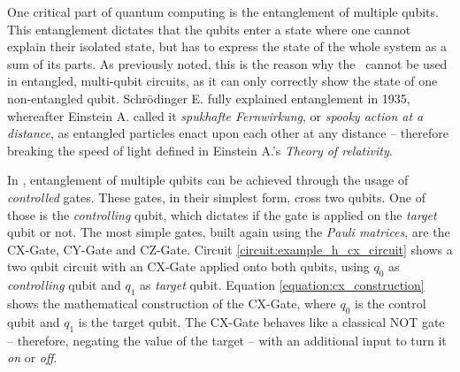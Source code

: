 \newpage

One critical part of quantum computing is the entanglement of multiple qubits. This entanglement dictates that the qubits enter a state where one cannot explain their isolated state, but has to express the state of the whole system as a sum of its parts. As previously noted, this is the reason why the \bloch\ cannot be used in entangled, multi-qubit circuits, as it can only correctly show the state of one non-entangled qubit. Schrödinger E. fully explained entanglement in 1935\cite{schroedinger_discussion_entanglement}, whereafter Einstein A. called it \emph{spukhafte Fernwirkung}, or \emph{spooky action at a distance}, as entangled particles enact upon each other at any distance – therefore breaking the speed of light defined in Einstein A.'s \emph{Theory of relativity}\cite{einstein_grundlage_1916}.  \par
In , entanglement of multiple qubits can be achieved through the usage of \emph{controlled} gates. These gates, in their simplest form, cross two qubits. One of those is the \emph{controlling} qubit, which dictates if the gate is applied on the \emph{target} qubit or not. The most simple gates, built again using the \emph{Pauli matrices}, are the CX-Gate\cite{qiskit_cxgate_nodate}, CY-Gate\cite{qiskit_cygate_nodate} and CZ-Gate\cite{qiskit_czgate_nodate}. Circuit \ref{circuit:example_h_cx_circuit} shows a two qubit circuit with an CX-Gate applied onto both qubits, using $q_0$ as \emph{controlling} qubit and $q_1$ as \emph{target} qubit. Equation \ref{equation:cx_construction} shows the mathematical construction of the CX-Gate, where $q_0$ is the control qubit and $q_1$ is the target qubit. The CX-Gate behaves like a classical NOT gate – therefore, negating the value of the target – with an additional input to turn it \emph{on} or \emph{off}.

